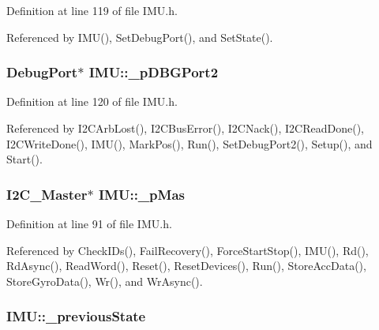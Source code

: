 Definition at line 119 of file IMU.h.



Referenced by IMU(), SetDebugPort(), and SetState().

\hypertarget{class_i_m_u_a1cf5672a28049d5885a2958010188928}{
\subsubsection[{\_\-pDBGPort2}]{\setlength{\rightskip}{0pt plus 5cm}DebugPort$\ast$ {\bf IMU::\_\-pDBGPort2}}}
\label{class_i_m_u_a1cf5672a28049d5885a2958010188928}


Definition at line 120 of file IMU.h.



Referenced by I2CArbLost(), I2CBusError(), I2CNack(), I2CReadDone(), I2CWriteDone(), IMU(), MarkPos(), Run(), SetDebugPort2(), Setup(), and Start().

\hypertarget{class_i_m_u_a466148932203b7250c83a4c5bb684ca1}{
\subsubsection[{\_\-pMas}]{\setlength{\rightskip}{0pt plus 5cm}I2C\_\-Master$\ast$ {\bf IMU::\_\-pMas}}}
\label{class_i_m_u_a466148932203b7250c83a4c5bb684ca1}


Definition at line 91 of file IMU.h.



Referenced by CheckIDs(), FailRecovery(), ForceStartStop(), IMU(), Rd(), RdAsync(), ReadWord(), Reset(), ResetDevices(), Run(), StoreAccData(), StoreGyroData(), Wr(), and WrAsync().

\hypertarget{class_i_m_u_aca284ca1bcf10458005d4ca630833ea9}{
\subsubsection[{\_\-previousState}]{ {\bf IMU::\_\-previousState}}}
\label{class_i_m_u_aca284ca1bcf10458005d4ca630833ea9}


